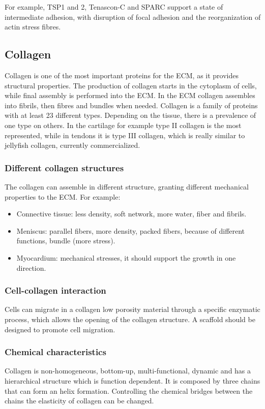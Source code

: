 	For example, TSP1 and 2, Tenascon-C and SPARC support a state of intermediate adhesion, with disruption of focal adhesion and the reorganization of actin stress fibres.

	\subsection{Collagen}
	Collagen is one of the most important proteins for the ECM, as it provides structural properties.
	The production of collagen starts in the cytoplasm of cells, while final assembly is performed into the ECM.
	In the ECM collagen assembles into fibrils, then fibres and bundles when needed.
	Collagen is a family of proteins with at least 23 different types.
	Depending on the tissue, there is a prevalence of one type on others.
	In the cartilage for example type II collagen is the most represented, while in tendons it is type III collagen, which is really similar to jellyfish collagen, currently commercialized.

		\subsubsection{Different collagen structures}
		The collagen can assemble in different structure, granting different mechanical properties to the ECM.
		For example:

		\begin{multicols}{2}
			\begin{itemize}
				\item Connective tissue: less density, soft network, more water, fiber and fibrils.
				\item Meniscus: parallel fibers, more density, packed fibers, because of different functions, bundle (more stress).
				\item Myocardium: mechanical stresses, it should support the growth in one direction.
			\end{itemize}
		\end{multicols}

		\subsubsection{Cell-collagen interaction}
		Cells can migrate in a collagen low porosity material through a specific enzymatic process, which allows the opening of the collagen structure.
		A scaffold should be designed to promote cell migration.

		\subsubsection{Chemical characteristics}
		Collagen is non-homogeneous, bottom-up, multi-functional, dynamic and has a hierarchical structure which is function dependent.
		It is composed by three chains that can form an helix formation.
		Controlling the chemical bridges between the chains the elasticity of collagen can be changed.

